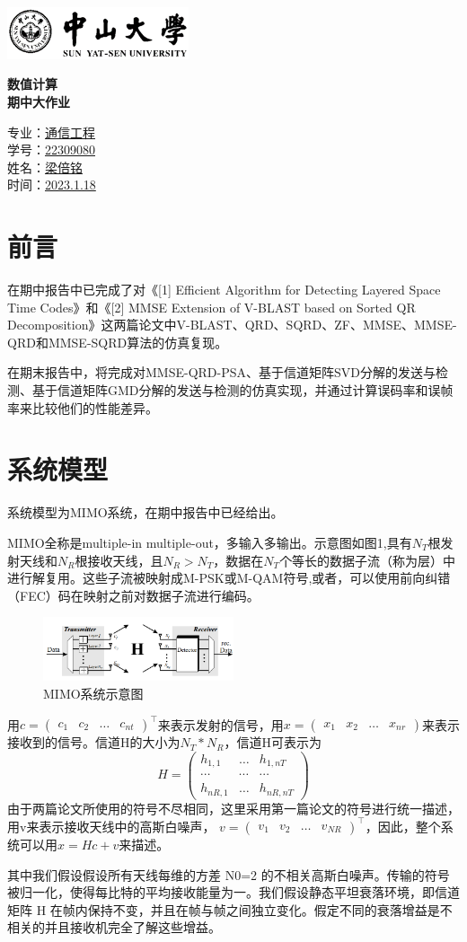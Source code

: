 \documentclass[a4paper,12pt]{article}
\renewcommand{\maketitle}{
	\begin{titlepage}
		\begin{center}
			\includegraphics[width=0.4\textwidth]{1_1.png} %
			\vspace{4cm}
			
			\zihao{1} \textbf{数值计算\\期中大作业} \\
			\vspace{2cm}
			
			\zihao{3} 专业：\uline{通信工程} \\
			\vspace{0.5cm} 
			\zihao{3} 学号：\uline{22309080} \\
			\vspace{0.5cm} 
			\zihao{3} 姓名：\uline{梁倍铭} \\
			\vspace{0.5cm} 
			\zihao{3} 时间：\uline{2023.1.18} \\
			\vfill
		\end{center}
	\end{titlepage}
}
\begin{document}
	\maketitle
	\tableofcontents
	\newpage
	\large
	\onehalfspacing
	\section{前言}
	在期中报告中已完成了对《[1] Efficient Algorithm for Detecting Layered Space Time Codes》和《[2] MMSE Extension of V-BLAST based on Sorted QR Decomposition》这两篇论文中V-BLAST、QRD、SQRD、ZF、MMSE、MMSE-QRD和MMSE-SQRD算法的仿真复现。\par 
	在期末报告中，将完成对MMSE-QRD-PSA、基于信道矩阵SVD分解的发送与检测、基于信道矩阵GMD分解的发送与检测的仿真实现，并通过计算误码率和误帧率来比较他们的性能差异。
	\section{系统模型}
	系统模型为MIMO系统，在期中报告中已经给出。\par 
	MIMO全称是multiple-in multiple-out，多输入多输出。示意图如图1,具有$N_T$根发射天线和$N_R$根接收天线，且$N_R>N_T$，数据在$N_T$个等长的数据子流（称为层）中进行解复用。这些子流被映射成M-PSK或M-QAM符号,或者，可以使用前向纠错（FEC）码在映射之前对数据子流进行编码。\par 
	\begin{figure}[h]
		\centering
		\includegraphics[width=0.5\textwidth]{1.png}
		\caption{MIMO系统示意图}
	\end{figure}
	用$c=\begin{pmatrix}
		c_1&c_2&\dots &c_{nt}
	\end{pmatrix}^\top $来表示发射的信号，用$x=\begin{pmatrix}
		x_1&x_2& \dots &x_{nr}
	\end{pmatrix}$来表示接收到的信号。信道H的大小为$N_T*N_R$，信道H可表示为$$H=\begin{pmatrix}
		h_{1,1}& \dots & h_{1,nT} \\
		\cdots &	\cdots	& \cdots \\
		h_{nR,1}& \dots & h_{nR,nT}
	\end{pmatrix}$$
	由于两篇论文所使用的符号不尽相同，这里采用第一篇论文的符号进行统一描述，用v来表示接收天线中的高斯白噪声，
	$v=\begin{pmatrix}
		v_1&v_2& \dots & v_{NR}
	\end{pmatrix}^\top$，因此，整个系统可以用$x=Hc+v$来描述。\par 
	其中我们假设假设所有天线每维的方差 N0=2 的不相关高斯白噪声。传输的符号被归一化，使得每比特的平均接收能量为一。我们假设静态平坦衰落环境，即信道矩阵 H 在帧内保持不变，并且在帧与帧之间独立变化。假定不同的衰落增益是不相关的并且接收机完全了解这些增益。
\end{document}
